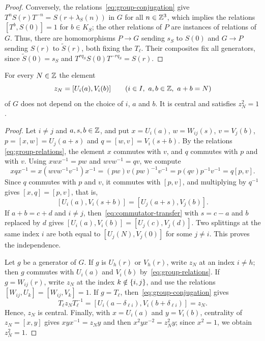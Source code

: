 \begin{proof}
  Conversely, the relations~\eqref{eq:group-conjugation} give
  ${T^nS(r)T^{-n}=S(r+\lambda_S(n))}$ in $G$ for all ${n\in\mathbb{Z}^3}$, which implies
  the relations ${[T^b,S(0)]=1}$ for ${b\in K_S}$; the other relations of $P$ are
  instances of relations of $G$. Thus, there are homomorphisms ${P\to G}$ sending
  $s_S$ to $S(0)$ and ${G\to P}$ sending $S(r)$ to $\widetilde{S}(r)$, both
  fixing the $T_\ell$. Their composites fix all generators, since
  ${\widetilde{S}(0)=s_S}$ and ${T^{rq_S}S(0)T^{-rq_S}=S(r)}$.
\end{proof}

\begin{proposition}
  \label{prop:central-involutions}
  For every ${N\in\mathbb{Z}}$ the element
  \[
    z_N=[U_i(a),V_i(b)]\qquad(i\in I,\ a,b\in\ZZ,\ a+b=N)
  \]
  of $G$ does not depend on the choice of $i$, $a$ and $b$. It is central and
  satisfies ${z_N^2=1}$.
\end{proposition}

\begin{proof}
  Let ${i\neq j}$ and ${a,s,b\in\mathbb{Z}}$, and put ${x=U_i(a)}$, ${w=W_{ij}(s)}$,
  ${v=V_j(b)}$, ${p}={[x,w]}={U_j(a+s)}$ and ${q}={[w,v]}={V_i(s+b)}$. By the relations
  \eqref{eq:group-relations}, the element $x$ commutes with $v$, and $q$
  commutes with $p$ and with $v$. Using ${xwx^{-1}=pw}$ and ${wvw^{-1}=qv}$, we
  compute
  \[
    xqx^{-1}=x(wvw^{-1}v^{-1})x^{-1}=(pw)v(pw)^{-1}v^{-1}
    =p(qv)p^{-1}v^{-1}=q[p,v].
  \]
  Since $q$ commutes with $p$ and $v$, it commutes with $[p,v]$, and
  multiplying by $q^{-1}$ gives ${[x,q]=[p,v]}$, that is,
  \begin{equation}
    \label{eq:commutator-transfer}
    [U_i(a),V_i(s+b)]=[U_j(a+s),V_j(b)].
  \end{equation}
  If ${a+b=c+d}$ and ${i\neq j}$, then~\eqref{eq:commutator-transfer} with
  ${s=c-a}$ and $b$ replaced by $d$ gives ${[U_i(a),V_i(b)]=[U_j(c),V_j(d)]}$.
  Two splittings at the same index $i$ are both equal to $[U_j(N),V_j(0)]$ for
  some ${j\neq i}$. This proves the independence.

  Let $g$ be a generator of $G$. If $g$ is $U_h(r)$ or $V_h(r)$, write $z_N$ at
  an index ${i\neq h}$; then $g$ commutes with $U_i(a)$ and $V_i(b)$
  by~\eqref{eq:group-relations}. If ${g=W_{ij}(r)}$, write $z_N$ at the index
  ${k\notin\set{i,j}}$, and use the relations ${[W_{ij},U_k]=[W_{ij},V_k]=1}$. If
  ${g=T_\ell}$, then~\eqref{eq:group-conjugation} gives
  \[
    T_\ell z_NT_\ell^{-1}=[U_i(a-\delta_{\ell i}),V_i(b+\delta_{\ell i})]=z_N.
  \]
  Hence, $z_N$ is central. Finally, with ${x=U_i(a)}$ and ${y=V_i(b)}$, centrality
  of ${z_N=[x,y]}$ gives ${xyx^{-1}=z_Ny}$ and then ${x^2yx^{-2}=z_N^2y}$; since
  ${x^2=1}$, we obtain ${z_N^2=1}$.
\end{proof}

